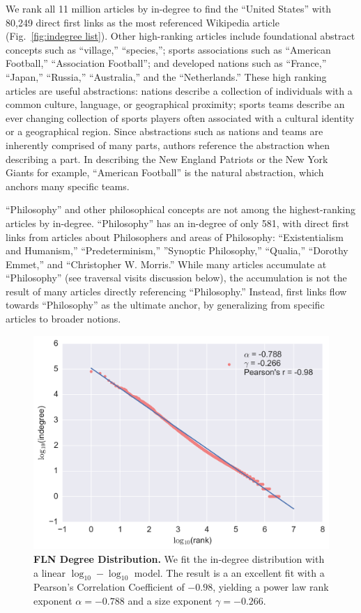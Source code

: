\documentclass[pre,twocolumn,twoside,superscriptaddress,floatfix, aps, 10pt]{revtex4-1}
\begin{document}
We rank all 11 million articles by in-degree to find 
the ``United States'' with 80,249 direct first links as the most referenced
Wikipedia article 
(Fig.~\ref{fig:indegree list}). 
Other high-ranking articles
include foundational abstract concepts such as ``village,'' ``species,''; 
sports associations such as ``American Football,'' ``Association Football''; 
and developed nations such as ``France,'' ``Japan,'' ``Russia,'' ``Australia,'' and 
the ``Netherlands.'' These high ranking articles are useful abstractions: nations
describe a collection of individuals with a common culture, language, or 
geographical proximity; sports teams describe an ever changing collection of 
sports players often associated with a cultural identity or a geographical 
region. 
Since abstractions such as nations and teams are inherently comprised
of many parts, authors reference the abstraction when describing a part.
In describing the New England Patriots or the New York Giants
for example, ``American Football'' is the natural abstraction, which 
anchors many specific teams.

``Philosophy'' and other philosophical concepts
are not among the highest-ranking articles by in-degree.
``Philosophy'' has an in-degree of only 581, with direct first links from articles about Philosophers and areas of Philosophy: ``Existentialism and Humanism,'' ``Predeterminism,'' ''Synoptic Philosophy,'' ``Qualia,'' ``Dorothy Emmet,'' and ``Christopher W. Morris.''
While many articles accumulate at ``Philosophy'' (see traversal visits discussion below), 
the accumulation is not the 
result of many articles directly referencing ``Philosophy.'' 
Instead, first links flow towards ``Philosophy'' as the 
ultimate anchor, by generalizing from specific articles to broader notions.

\begin{figure}[tp!]
  \includegraphics[width=\columnwidth]{graphics/ndegree_loglog.png}
  \caption{
    \textbf{FLN Degree Distribution.}
We fit the in-degree distribution with a linear $\log_{10}-\log_{10}$ model. 
The result is a 
an excellent fit with a Pearson's Correlation Coefficient of $-0.98$, yielding a 
power law rank exponent $\alpha = -0.788$ and a size exponent $\gamma = -0.266$. 
}
  \label{fig:degree distribution}
\end{figure}
\end{document}
